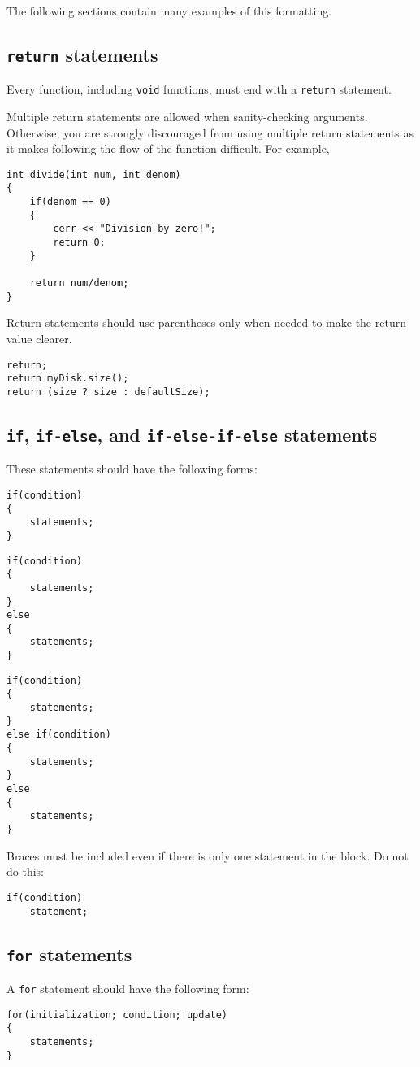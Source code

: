 \documentclass{article}
\newcommand{\code}[1]{\texttt{\colorbox{gray!30}{#1}}}
\begin{document}
The following sections contain many examples of this formatting.

\subsection{\code{return} statements}
Every function, including \code{void} functions, must end with a \code{return} statement.

Multiple return statements are allowed when sanity-checking arguments.
Otherwise, you are strongly discouraged from using multiple return statements as it makes following the flow of the function difficult.
For example,
\begin{lstlisting}
int divide(int num, int denom)
{
	if(denom == 0)
	{
		cerr << "Division by zero!";
		return 0;
	}

	return num/denom;
}
\end{lstlisting}

Return statements should use parentheses only when needed to make the return value clearer.
\begin{lstlisting}
return;
return myDisk.size();
return (size ? size : defaultSize);
\end{lstlisting}

\subsection{\code{if}, \code{if-else}, and \code{if-else-if-else} statements}
These statements should have the following forms:
\begin{lstlisting}
if(condition)
{
	statements;
}
\end{lstlisting}
\begin{lstlisting}
if(condition)
{
	statements;
}
else
{
	statements;
}
\end{lstlisting}
\begin{lstlisting}
if(condition)
{
	statements;
}
else if(condition)
{
	statements;
}
else
{
	statements;
}
\end{lstlisting}

Braces must be included even if there is only one statement in the block.
Do not do this:
\begin{lstlisting}
if(condition)
	statement;
\end{lstlisting}

\subsection{\code{for} statements}
A \code{for} statement should have the following form:
\begin{lstlisting}
for(initialization; condition; update)
{
	statements;
}
\end{lstlisting}
\end{document}
